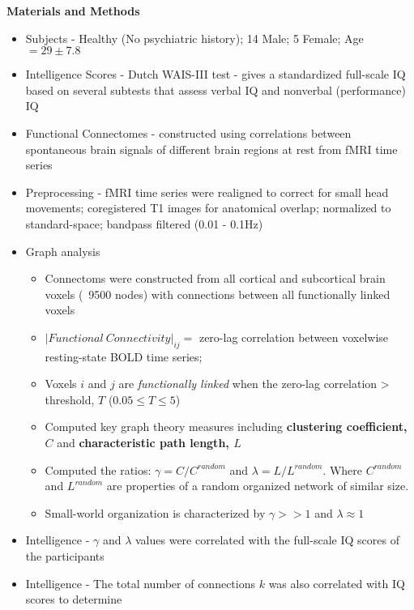 \documentclass[11pt, letterpaper]{article}
\begin{document}
\noindent\textbf{Materials and Methods}
\begin{itemize}
    \setlength\itemsep{0.05em}
    \item Subjects - Healthy (No psychiatric history); 14 Male; 5 Female; Age$=29\pm7.8$
    \item {Intelligence Scores - Dutch WAIS-III test - gives a standardized full-scale IQ based on
           several subtests that assess verbal IQ and nonverbal (performance) IQ}
    \item {Functional Connectomes - constructed using correlations between spontaneous brain signals of
           different brain regions at rest from fMRI time series}
    \item {Preprocessing - fMRI time series were realigned to correct for small head movements; coregistered 
           T1 images for anatomical overlap; normalized to standard-space; bandpass filtered (0.01 - 0.1Hz)}
    \item {
        Graph analysis
        \begin{itemize}
            \setlength\itemsep{0.05em}
            \item Connectoms were constructed from all cortical and subcortical brain voxels (~9500 nodes) with
                  connections between all functionally linked voxels
            \item $|Functional~Connectivity|_{ij} =$ zero-lag correlation between voxelwise resting-state BOLD time series;
            \item {Voxels $i$ and $j$ are \textit{functionally linked} when the zero-lag correlation > threshold, 
                   $T$ ($0.05 \leq T \leq 5$)}
            \item Computed key graph theory measures including \textbf{clustering coefficient, $C$} and 
            \textbf{characteristic path length, $L$}
            \item {Computed the ratios: $\gamma = C/C^{random}$ and $\lambda = L/L^{random}$.
                   Where $C^{random}$ and $L^{random}$ are properties of a random organized network of similar size.}
            \item {Small-world organization is characterized by $\gamma >> 1$ and $\lambda \approx 1$}
        \end{itemize}
    }
    \item {Intelligence -  $\gamma$ and $\lambda$ values were correlated with the full-scale IQ scores of the
           participants}
    \item {Intelligence - The total number of connections $k$ was also correlated with IQ scores to determine 
}
\end{itemize}
\end{document}
